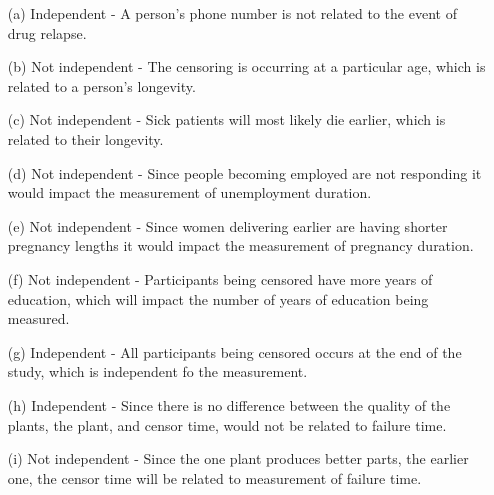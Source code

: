 \documentclass[12pt]{article}
\begin{document}
\begin{enumerate}
    \item[(a)] Independent - A person's phone number is not related to the event of drug relapse.
    \item[(b)] Not independent - The censoring is occurring at a particular age, which is related to a person's longevity. 
    \item[(c)] Not independent - Sick patients will most likely die earlier, which is related to their longevity.
    \item[(d)] Not independent - Since people becoming employed are not responding it would impact the measurement of unemployment duration.
    \item[(e)] Not independent - Since women delivering earlier are having shorter pregnancy lengths it would impact the measurement of pregnancy duration.
    \item[(f)] Not independent - Participants being censored have more years of education, which will impact the number of years of education being measured.
    \item[(g)] Independent - All participants being censored occurs at the end of the study, which is independent fo the measurement.
    \item[(h)] Independent - Since there is no difference between the quality of the plants, the plant, and censor time, would not be related to failure time.
    \item[(i)] Not independent - Since the one plant produces better parts, the earlier one, the censor time will be related to measurement of failure time.
\end{enumerate}
\end{document}
